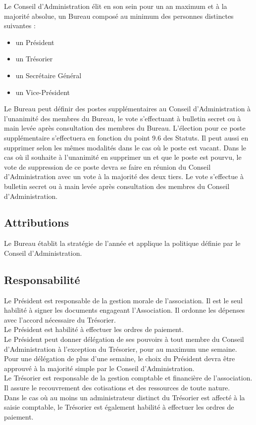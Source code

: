 \documentclass[12pt]{article}
\begin{document}
Le Conseil d’Administration élit en son sein pour un an maximum et à la majorité absolue, un Bureau composé
au minimum des personnes distinctes suivantes :

\begin{itemize}
    \item un Président
    \item un Trésorier
    \item un Secrétaire Général
    \item un Vice-Président
\end{itemize}

Le Bureau peut définir des postes supplémentaires au Conseil d’Administration à l’unanimité des membres
du Bureau, le vote s’effectuant à bulletin secret ou à main levée après consultation des membres du Bureau.
L’élection pour ce poste supplémentaire s’effectuera en fonction du point 9.6 des Statuts.
Il peut aussi en supprimer selon les mêmes modalités dans le cas où le poste est vacant. Dans le cas où il
souhaite à l’unanimité en supprimer un et que le poste est pourvu, le vote de suppression de ce poste devra
se faire en réunion du Conseil d’Administration avec un vote à la majorité des deux tiers. Le vote s’effectue à
bulletin secret ou à main levée après consultation des membres du Conseil d’Administration.


\subsection{Attributions}
\label{sec:bureau:attributions}

Le Bureau établit la stratégie de l’année et applique la politique définie par le Conseil d’Administration.

\subsection{Responsabilité}
\label{sec:bureau:responsabilité}

Le Président est responsable de la gestion morale de l’association. Il est le seul habilité à signer les documents
engageant l’Association. Il ordonne les dépenses avec l’accord nécessaire du Trésorier.\\
Le Président est habilité à effectuer les ordres de paiement.\\
Le Président peut donner délégation de ses pouvoirs à tout membre du Conseil d’Administration à l’exception
du Trésorier, pour au maximum une semaine. Pour une délégation de plus d’une semaine, le choix du
Président devra être approuvé à la majorité simple par le Conseil d’Administration.\\
Le Trésorier est responsable de la gestion comptable et financière de l’association. Il assure le recouvrement
des cotisations et des ressources de toute nature.\\
Dans le cas où au moins un administrateur distinct du Trésorier est affecté à la saisie comptable, le Trésorier
est également habilité à effectuer les ordres de paiement.\\
\end{document}
